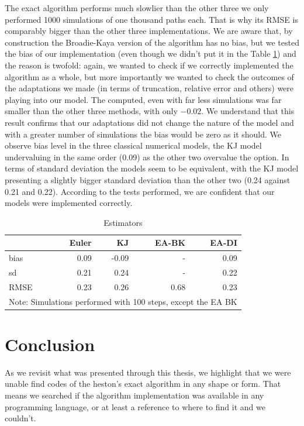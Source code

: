 \documentclass[12pt,twoside]{reedthesis}
\theoremstyle{definition}
\theoremstyle{definition}
\theoremstyle{remark}
\begin{document}
  The exact algorithm performs much slowlier than the other three we only
  performed 1000 simulations of one thousand paths each. That is why its
  RMSE is comparably bigger than the other three implementations. We are
  aware that, by construction the Broadie-Kaya version of the algorithm
  has no bias, but we tested the bias of our implementation (even though
  we didn't put it in the Table \ref{res2}) and the reason is twofold:
  again, we wanted to check if we correctly implemented the algorithm as a
  whole, but more importantly we wanted to check the outcomes of the
  adaptations we made (in terms of truncation, relative error and others)
  were playing into our model. The computed, even with far less
  simulations was far smaller than the other three methods, with only
  \(-0.02\). We understand that this result confirms that our adaptations
  did not change the nature of the model and with a greater number of
  simulations the bias would be zero as it should. We observe bias level
  in the three classical numerical models, the KJ model undervaluing in
  the same order (0.09) as the other two overvalue the option. In terms of
  standard deviation the models seem to be equivalent, with the KJ model
  presenting a slightly bigger standard deviation than the other two (0.24
  against 0.21 and 0.22). According to the tests performed, we are
  confident that our models were implemented correctly.
  \begin{table}[t]
  \centering
  \begin{tabular}{lrrrr}
    \hline 
   & Euler & KJ & EA-BK & EA-DI \\ 
    \hline 
  bias & 0.09 & -0.09 & - & 0.09 \\ 
    sd & 0.21 & 0.24 & - & 0.22 \\ 
    RMSE & 0.23 & 0.26 & 0.68 & 0.23 \\ 
     \hline 
  \multicolumn{5}{l}{\scriptsize{Note: Simulations performed with 100 steps, except the EA BK}} 
  \end{tabular}
  \caption{Estimators} 
  \label{res2}
  \end{table}
  \chapter{Conclusion}\label{conclusao}
  
  As we revisit what was presented through this thesis, we highlight that
  we were unable find codes of the heston's exact algorithm in any shape
  or form. That means we searched if the algorithm implementation was
  available in any programming language, or at least a reference to where
  to find it and we couldn't.
  
\end{document}
